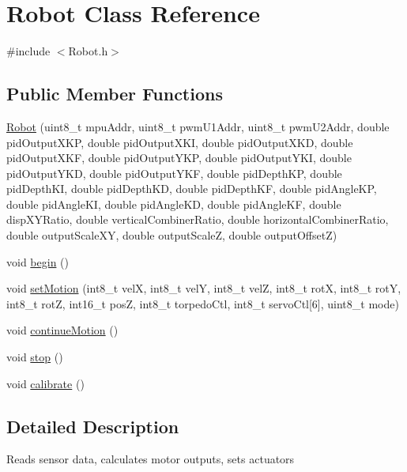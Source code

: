 \hypertarget{class_robot}{\section{Robot Class Reference}
\label{class_robot}
}


{\ttfamily \#include $<$Robot.\+h$>$}

\subsection*{Public Member Functions}
\begin{DoxyCompactItemize}
\item 
\hyperlink{class_robot_af42e5f1555c6a688af3577f1fc3262cb}{Robot} (uint8\+\_\+t mpu\+Addr, uint8\+\_\+t pwm\+U1\+Addr, uint8\+\_\+t pwm\+U2\+Addr, double pid\+Output\+X\+K\+P, double pid\+Output\+X\+K\+I, double pid\+Output\+X\+K\+D, double pid\+Output\+X\+K\+F, double pid\+Output\+Y\+K\+P, double pid\+Output\+Y\+K\+I, double pid\+Output\+Y\+K\+D, double pid\+Output\+Y\+K\+F, double pid\+Depth\+K\+P, double pid\+Depth\+K\+I, double pid\+Depth\+K\+D, double pid\+Depth\+K\+F, double pid\+Angle\+K\+P, double pid\+Angle\+K\+I, double pid\+Angle\+K\+D, double pid\+Angle\+K\+F, double disp\+X\+Y\+Ratio, double vertical\+Combiner\+Ratio, double horizontal\+Combiner\+Ratio, double output\+Scale\+X\+Y, double output\+Scale\+Z, double output\+Offset\+Z)
\item 
void \hyperlink{class_robot_a6c7ee2437ae5427a19f2de4903ca0df9}{begin} ()
\item 
void \hyperlink{class_robot_ab5fd69af8c7ee03c95202cc72811bc12}{set\+Motion} (int8\+\_\+t vel\+X, int8\+\_\+t vel\+Y, int8\+\_\+t vel\+Z, int8\+\_\+t rot\+X, int8\+\_\+t rot\+Y, int8\+\_\+t rot\+Z, int16\+\_\+t pos\+Z, int8\+\_\+t torpedo\+Ctl, int8\+\_\+t servo\+Ctl\mbox{[}6\mbox{]}, uint8\+\_\+t mode)
\item 
void \hyperlink{class_robot_a9f9fae1804d08fa647589d8d33a8642f}{continue\+Motion} ()
\item 
void \hyperlink{class_robot_a14dfe126ae973d3b9f81fee81a06ac22}{stop} ()
\item 
void \hyperlink{class_robot_abaaaf25f6bb3d2c67fcaae9d9caca8fe}{calibrate} ()
\end{DoxyCompactItemize}


\subsection{Detailed Description}
Reads sensor data, calculates motor outputs, sets actuators 

